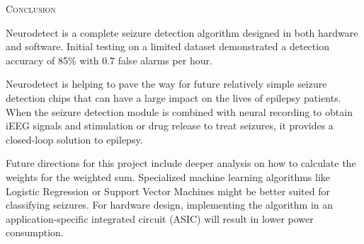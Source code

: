 \documentclass[usletter, 11pt]{extarticle}
\begin{document}
\vspace{11pt}
\textsc{Conclusion}
\vspace{11pt}

Neurodetect is a complete seizure detection algorithm designed in both hardware and software. Initial testing on a limited dataset demonstrated a detection accuracy of 85\% with 0.7 false alarms per hour.

Neurodetect is helping to pave the way for future relatively simple seizure detection chips that can have a large impact on the lives of epilepsy patients. When the seizure detection module is combined with neural recording to obtain iEEG signals and stimulation or drug release to treat seizures, it provides a closed-loop solution to epilepsy.

Future directions for this project include deeper analysis on how to calculate the weights for the weighted sum. Specialized machine learning algorithms like Logistic Regression or Support Vector Machines might be better suited for classifying seizures. For hardware design, implementing the algorithm in an application-specific integrated circuit (ASIC) will result in lower power consumption.


\clearpage



\end{document}
